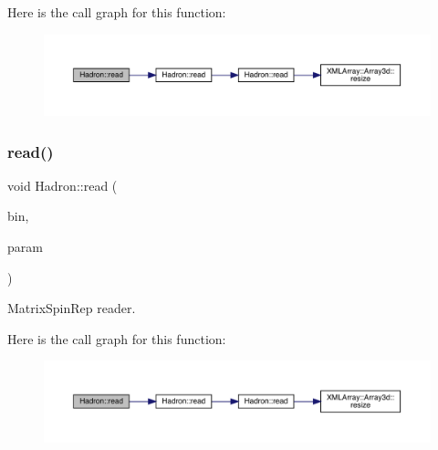 Here is the call graph for this function\+:
\nopagebreak
\begin{figure}[H]
\begin{center}
\leavevmode
\includegraphics[width=350pt]{d1/daf/namespaceHadron_ae5cdeeff0a8ced82bfb5f5a46595faf8_cgraph}
\end{center}
\end{figure}
\mbox{\label{namespaceHadron_af8ce56081c184ce7dd924a192bff08a6}} 
\subsubsection{\texorpdfstring{read()}{read()}\hspace{0.1cm}{\footnotesize\ttfamily [37/94]}}
{\footnotesize\ttfamily void Hadron\+::read (\begin{DoxyParamCaption}\item[{\mbox{\hyperlink{classADATIO_1_1BinaryReader}{Binary\+Reader}} \&}]{bin,  }\item[{\mbox{\hyperlink{structHadron_1_1MatrixSpinRep__t}{Matrix\+Spin\+Rep\+\_\+t}} \&}]{param }\end{DoxyParamCaption})}



Matrix\+Spin\+Rep reader. 

Here is the call graph for this function\+:
\nopagebreak
\begin{figure}[H]
\begin{center}
\leavevmode
\includegraphics[width=350pt]{d1/daf/namespaceHadron_af8ce56081c184ce7dd924a192bff08a6_cgraph}
\end{center}
\end{figure}
\mbox{\label{namespaceHadron_a3b1642acb606c69519cf7dd88a01fbfd}} 
